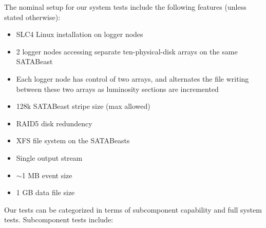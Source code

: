 The nominal setup for our system tests include the following features (unless stated
otherwise):
\begin{itemize}
  \item SLC4 Linux installation on logger nodes
  \item 2 logger nodes accessing separate ten-physical-disk arrays on the same SATABeast
  \item Each logger node has control of two arrays, and alternates the file writing
between these two arrays as luminosity sections are incremented
  \item 128k SATABeast stripe size (max allowed)
  \item RAID5 disk redundency
  \item XFS file system on the SATABeasts
  \item Single output stream
  \item $\sim$1 MB event size
  \item 1 GB data file size 
\end{itemize}
Our tests can be categorized in terms of subcomponent capability and full system tests.
Subcomponent tests include:
